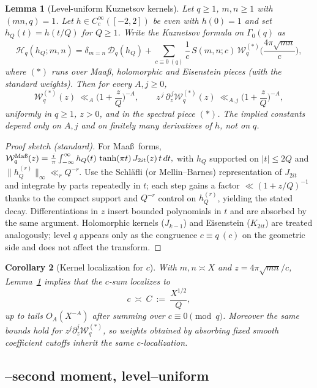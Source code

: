 \documentclass[11pt]{article}
\newtheorem{lemma}{Lemma}[part]
\newtheorem{corollary}[lemma]{Corollary}
\theoremstyle{definition}
\theoremstyle{remark}
\numberwithin{equation}{part}
\begin{document}
\begin{lemma}[Level-uniform Kuznetsov kernels]\label{lem:kuznetsov-uniform}
	Let $q\ge1$, $m,n\ge1$ with $(mn,q)=1$.
	Let $h\in C_c^\infty([-2,2])$ be even with $h(0)=1$ and set $h_Q(t)=h(t/Q)$ for $Q\ge1$.
	Write the Kuznetsov formula on $\Gamma_0(q)$ as
	\[
		\mathcal H_q(h_Q;m,n)
		=\delta_{m=n}\,\mathcal D_q(h_Q)
		+\sum_{c\equiv 0\ (q)} \frac{1}{c}\,S(m,n;c)\,\mathcal W_q^{(*)}\!\Big(\frac{4\pi\sqrt{mn}}{c}\Big),
	\]
	where $(*)$ runs over Maa\ss, holomorphic and Eisenstein pieces (with the standard weights).
	Then for every $A,j\ge0$,
	\[
		\mathcal W_q^{(*)}(z)\ \ll_A \Big(1+\frac{z}{Q}\Big)^{-A},
		\qquad
		z^{\,j}\,\partial_z^{\,j}\mathcal W_q^{(*)}(z)\ \ll_{A,j} \Big(1+\frac{z}{Q}\Big)^{-A},
	\]
	uniformly in $q\ge1$, $z>0$, and in the spectral piece $(*)$.
	The implied constants depend only on $A,j$ and on finitely many derivatives of $h$, not on $q$.
\end{lemma}

\begin{proof}[Proof sketch (standard)]
	For Maa\ss\ forms,
	\(
	\mathcal W_q^{\mathrm{Ma\text\ss}}(z)=\frac{i}{\pi}\int_{-\infty}^{\infty} h_Q(t)\,\tanh(\pi t)\,J_{2it}(z)\,t\,dt,
	\)
	with $h_Q$ supported on $|t|\le 2Q$ and $\|h_Q^{(r)}\|_\infty\ll_r Q^{-r}$.
	Use the Schl\"afli (or Mellin–Barnes) representation of $J_{2it}$ and integrate by parts repeatedly in $t$;
	each step gains a factor $\ll (1+z/Q)^{-1}$ thanks to the compact support and $Q^{-r}$ control on $h_Q^{(r)}$,
	yielding the stated decay. Differentiations in $z$ insert bounded polynomials in $t$ and are absorbed by the same argument.
	Holomorphic kernels ($J_{k-1}$) and Eisenstein ($K_{2it}$) are treated analogously; level $q$ appears only as the congruence $c\equiv q\ (c)$ on the geometric side and does not affect the transform.
\end{proof}

\begin{corollary}[Kernel localization for $c$]\label{cor:kernel-localization}
	With $m,n\asymp X$ and $z=4\pi\sqrt{mn}/c$, Lemma~\ref{lem:kuznetsov-uniform} implies that the $c$-sum localizes to
	\[
		c\ \asymp\ C\ :=\ \frac{X^{1/2}}{Q},
	\]
	up to tails $O_A(X^{-A})$ after summing over $c\equiv0\pmod q$.
	Moreover the same bounds hold for $z^j\partial_z^j\mathcal W_q^{(*)}$, so weights obtained by absorbing fixed smooth coefficient cutoffs inherit the same $c$-localization.
\end{corollary}


\subsection{\textbf\textDelta--second moment, level--uniform}
\end{document}
